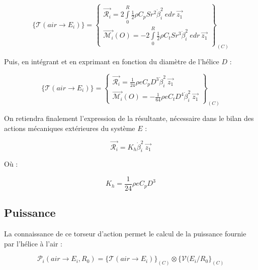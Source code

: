 \documentclass[10pt,a4paper]{article}
\begin{document}
\begin{equation}
\lbrace \mathcal{T}(air \rightarrow E_{i}) \rbrace = 
\left\{ \begin{array}{c} \vec{\mathcal{R}_{i}} = 
2\int \limits_{0}^{R} { \frac{1}{2} \rho C_{p} S r^2 \dot \beta_{i}^2 \ e dr \ \vec{z_{1}} } \\
\vec{\mathcal{M}_{i}}(O) = 
-2\int \limits_{0}^{R} { \frac{1}{2} \rho C_{t} S r^3 \dot \beta_{i}^2 \ e dr } \ \vec{z_{1}}

\end{array} \right\}_{(C)}
\end{equation}

Puis, en intégrant et en exprimant en fonction du diamètre de l'hélice $D$ :

\begin{equation}
\lbrace \mathcal{T}(air \rightarrow E_{i}) \rbrace = 
\left\{ \begin{array}{c} \vec{\mathcal{R}_{i}} = 
\frac{1}{24} \rho e C_{p} D^3 \dot \beta_{i}^2 \ \vec{z_{1}}
 \\
\vec{\mathcal{M}_{i}}(O) = 
- \frac{1}{64} \rho e C_{t} D^4 \dot \beta_{i}^2 \ \vec{z_{1}}

\end{array} \right\}_{(C)}
\end{equation}

On retiendra finalement l'expression de la résultante, nécessaire dans le bilan des actions mécaniques extérieures du système $E$ :

\begin{equation}
\vec{\mathcal{R}_{i}} = K_{h} \dot \beta_{i}^2 \ \vec{z_{1}}
\end{equation}

Où :

\begin{equation}
K_{h} = \frac{1}{24} \rho e C_{p} D^3
\end{equation}

\subsection{Puissance}

La connaissance de ce torseur d'action permet le calcul de la puissance fournie par l'hélice à l'air :

\begin{equation}
\mathcal{P}_{i}(air \rightarrow E_{i}, R_{0}) =
\lbrace \mathcal{T}(air \rightarrow E_{i}) \rbrace _{(C)} \otimes
\lbrace \mathcal{V}(E_{i} / R_{0} \rbrace _{(C)}
\end{equation}
\end{document}
